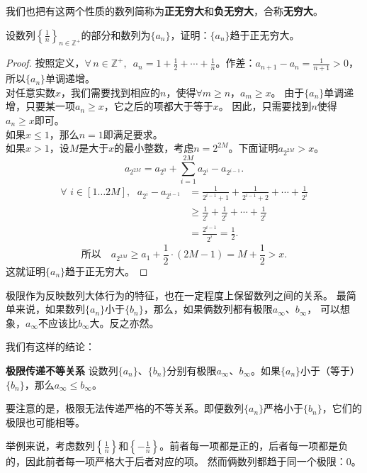 \documentclass[12pt,UTF8]{ctexbook}
\begin{document}
我们也把有这两个性质的数列简称为\textbf{正无穷大}和\textbf{负无穷大}，合称\textbf{无穷大}。

\begin{et}
    设数列$\left\{\frac{1}{n}\right\}_{n\in\mathbb{Z}^+}$的部分和数列为$\{a_n\}$，证明：$\{a_n\}$趋于正无穷大。
\end{et}
\begin{proof}
    按照定义，$ \forall \, n\in\mathbb{Z}^+,\,\,\,a_n = 1 + \frac{1}{2} + \cdots + \frac{1}{n}$。作差：$a_{n+1} - a_n = \frac{1}{n+1} > 0$，所以$\{a_n\}$单调递增。\\
    对任意实数$x$，我们需要找到相应的$n$，使得$\forall m \geqslant n$，$a_m \geqslant x$。
    由于$\{a_n\}$单调递增，只要某一项$a_n \geqslant x$，它之后的项都大于等于$x$。
    因此，只需要找到$n$使得$a_n \geqslant x$即可。\\
    如果$x \leqslant 1$，那么$n=1$即满足要求。\\
    如果$x > 1$，设$M$是大于$x$的最小整数，考虑$n = 2^{2M}$。下面证明$a_{2^{2M}}>x$。\\
    $$ a_{2^{2M}} = a_{2^0} + \sum_{i=1}^{2M}a_{2^i} - a_{2^{i-1}}.$$
    \begin{align*}
        \forall \,\, i\in[1\ldots 2M],\;\,\, a_{2^i} - a_{2^{i-1}} &= \frac{1}{2^{i-1}+1} + \frac{1}{2^{i-1}+2} + \cdots + \frac{1}{2^{i}}  \\
        &\geqslant \frac{1}{2^{i}} + \frac{1}{2^{i}} + \cdots + \frac{1}{2^{i}}  \\
        &= \frac{2^{i-1}}{2^{i}} = \frac{1}{2}. 
    \end{align*}
    $$ \mbox{所以}\quad  a_{2^{2M}} \geqslant a_1 + \frac{1}{2} \cdot (2M - 1) = M + \frac{1}{2} > x. $$
    这就证明$\{a_n\}$趋于正无穷大。
\end{proof}

极限作为反映数列大体行为的特征，也在一定程度上保留数列之间的关系。
最简单来说，如果数列$\{a_n\}$小于$\{b_n\}$，那么，如果俩数列都有极限$a_\infty$、$b_\infty$，
可以想象，$a_\infty$不应该比$b_\infty$大。反之亦然。

我们有这样的结论：
\begin{tm}{\textbf{极限传递不等关系}}
    设数列$\{a_n\}$、$\{b_n\}$分别有极限$a_\infty$、$b_\infty$。如果$\{a_n\}$小于（等于）$\{b_n\}$，那么$a_\infty\leqslant b_\infty$。
\end{tm}
要注意的是，极限无法传递严格的不等关系。即便数列$\{a_n\}$严格小于$\{b_n\}$，它们的极限也可能相等。

举例来说，考虑数列$\left\{\frac{1}{n}\right\}$和$\left\{-\frac{1}{n}\right\}$。前者每一项都是正的，后者每一项都是负的，因此前者每一项严格大于后者对应的项。
然而俩数列都趋于同一个极限：$0$。
\end{document}
